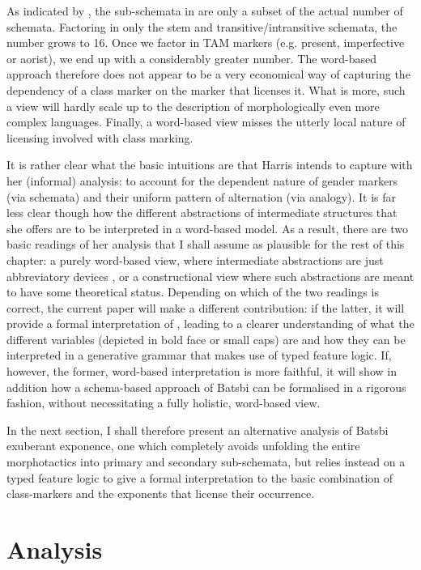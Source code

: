 \documentclass[output=paper]{langsci/langscibook}
\begin{document}
As indicated by \citet{Harris09}, the sub-schemata in
 are only a subset of the actual number of
schemata. Factoring in only the stem and transitive/intransitive
schemata, the number grows to 16. Once we factor in TAM markers
(e.g. present, imperfective or aorist), we end up with a considerably
greater number. The word-based approach therefore does not appear to
be a very economical way of capturing the dependency of a class marker
on the marker that licenses it. What is more, such a view will hardly
scale up to the description of morphologically even more complex
languages. Finally, a word-based view misses the utterly local nature
of licensing involved with class marking.

It is rather clear what the basic intuitions are that Harris intends
to capture with her (informal) analysis: to account for the dependent
nature of gender markers (via schemata) and their uniform pattern of
alternation (via analogy). It is far less clear though how the
different abstractions of intermediate structures that she offers are
to be interpreted in a word-based model. As a result, there are two
basic readings of her analysis that I shall assume as plausible for
the rest of this chapter: a purely word-based view, where intermediate
abstractions are just abbreviatory devices \citep[298]{Harris09},
or a constructional view where such abstractions are meant to have
some theoretical status. Depending on which of the two readings
is correct, the current paper will make a different contribution: if
the latter, it will provide a formal interpretation of
\citet{Harris09}, leading to a clearer understanding of what the different
variables (depicted in bold face or small caps) are and how they can
be interpreted in a generative grammar that makes use of typed feature
logic.  If, however, the former, word-based interpretation is more
faithful, it will show in addition how a schema-based approach of
Batsbi can be formalised in a rigorous fashion, without necessitating
a fully holistic, word-based view.

In the next section, I shall therefore present an alternative analysis
of Batsbi exuberant exponence, one which completely avoids unfolding the
entire morphotactics into primary and secondary sub-schemata, but
relies instead on a typed feature logic to give a formal
interpretation to the basic combination of class-markers and the
exponents that license their occurrence.  

  


\section{Analysis}
\label{sec:Analysis}
\end{document}
